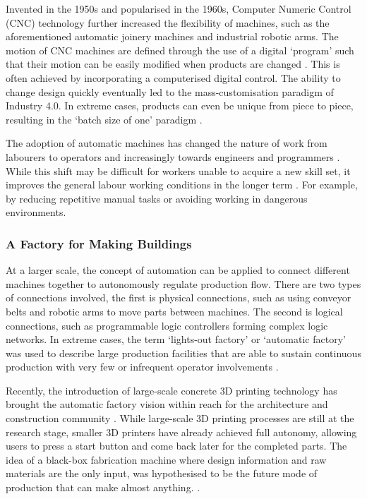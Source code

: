 Invented in the 1950s and popularised in the 1960s, Computer Numeric Control (CNC) technology further increased the flexibility of machines, such as the aforementioned automatic joinery machines and industrial robotic arms. The motion of CNC machines are defined through the use of a digital ‘program’ such that their motion can be easily modified when products are changed \parencite{wardAutomaticProgrammingNumerically1959}. This is often achieved by incorporating a computerised digital control. The ability to change design quickly eventually led to the mass-customisation paradigm of Industry 4.0. In extreme cases, products can even be unique from piece to piece, resulting in the ‘batch size of one’ paradigm \parencite{wardAutomaticProgrammingNumerically1959}.

The adoption of automatic machines has changed the nature of work from labourers to operators and increasingly towards engineers and programmers \parencite{nobleForcesProductionSocial1986}. While this shift may be difficult for workers unable to acquire a new skill set, it improves the general labour working conditions in the longer term \parencite{stromquistWorldDevelopmentReport2019}. For example, by reducing repetitive manual tasks or avoiding working in dangerous environments. 

\subsubsection{A Factory for Making Buildings}

At a larger scale, the concept of automation can be applied to connect different machines together to autonomously regulate production flow. There are two types of connections involved, the first is physical connections, such as using conveyor belts and robotic arms to move parts between machines. The second is logical connections, such as programmable logic controllers forming complex logic networks. In extreme cases, the term ‘lights-out factory’ or ‘automatic factory’ was used to describe large production facilities that are able to sustain continuous production with very few or infrequent operator involvements \parencite{nobleForcesProductionSocial1986,walkerAutomaticFactoryCase1957}. 

Recently, the introduction of large-scale concrete 3D printing technology has brought the automatic factory vision within reach for the architecture and construction community \parencite{ngoAdditiveManufacturing3D2018}. While large-scale 3D printing processes are still at the research stage, smaller 3D printers have already achieved full autonomy, allowing users to press a start button and come back later for the completed parts. The idea of a black-box fabrication machine where design information and raw materials are the only input, was hypothesised to be the future mode of production that can make almost anything.\parencite{gershenfeldHowMakeAlmost2012, gershenfeldInternetThings2004} .  

